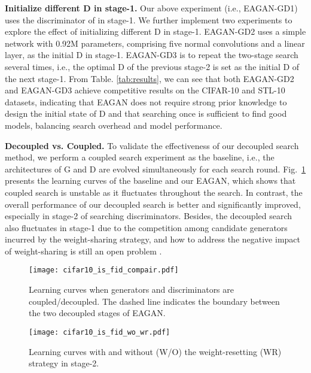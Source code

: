 \documentclass[runningheads]{llncs}
\begin{document}
\textbf{Initialize different D in stage-1.} Our above experiment (i.e., EAGAN-GD1) uses the discriminator of \cite{Adversarialnas} in stage-1. We further implement two experiments to explore the effect of initializing different D in stage-1. EAGAN-GD2 uses a simple network with 0.92M parameters, comprising five normal convolutions and a linear layer, as the initial D in stage-1. EAGAN-GD3 is to repeat the two-stage search several times, i.e., the optimal D of the previous stage-2 is set as the initial D of the next stage-1. From Table. \ref{tab:results}, we can see that both EAGAN-GD2 and EAGAN-GD3 achieve competitive results on the CIFAR-10 and STL-10 datasets, indicating that EAGAN does not require strong prior knowledge to design the initial state of D and that searching once is sufficient to find good models, balancing search overhead and model performance.






\textbf{Decoupled vs. Coupled.} To validate the effectiveness of our decoupled search method, we perform a coupled search experiment as the baseline, i.e., the architectures of G and D are evolved simultaneously for each search round. Fig.~\ref{fig:converge_compair} presents the learning curves of the baseline and our EAGAN, which shows that coupled search is unstable as it fluctuates throughout the search. In contrast, the overall performance of our decoupled search is better and significantly improved, especially in stage-2 of searching discriminators. Besides, the decoupled search also fluctuates in stage-1 due to the competition among candidate generators incurred by the weight-sharing strategy, and how to address the negative impact of weight-sharing is still an open problem \cite{xie2021weightsharing}.




\begin{figure}
    \centering
    \texttt{[image: cifar10\_is\_fid\_compair.pdf]}


    \caption{Learning curves when generators and discriminators are coupled/decoupled. The dashed line indicates the boundary between the two decoupled stages of EAGAN. }
    \label{fig:converge_compair}
\end{figure}


\begin{figure}
    \centering
    \texttt{[image: cifar10\_is\_fid\_wo\_wr.pdf]}


    \caption{Learning curves with and without (W/O) the weight-resetting (WR) strategy in stage-2.}
    \label{fig:effect_wr}
\end{figure}
\end{document}
